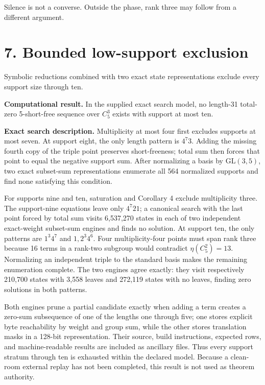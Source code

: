 \documentclass[
  11pt,
]{article}
\begin{document}
Silence is not a converse. Outside the phase, rank three may follow from
a different argument.

\hypertarget{bounded-low-support-exclusion}{%
\section{7. Bounded low-support
exclusion}\label{bounded-low-support-exclusion}}

Symbolic reductions combined with two exact state representations
exclude every support size through ten.

\textbf{Computational result.} In the supplied exact search model, no
length-31 total-zero 5-short-free sequence over \(C_5^3\) exists with
support at most ten.

\textbf{Exact search description.} Multiplicity at most four first
excludes supports at most seven. At support eight, the only length
pattern is \(4^7 3\). Adding the missing fourth copy of the triple point
preserves short-freeness; total sum then forces that point to equal the
negative support sum. After normalizing a basis by \(\mathrm{GL}(3,5)\),
two exact subset-sum representations enumerate all 564 normalized
supports and find none satisfying this condition.

For supports nine and ten, saturation and Corollary 4 exclude
multiplicity three. The support-nine equations leave only \(4^7 2 1\); a
canonical search with the last point forced by total sum visits
6,537,270 states in each of two independent exact-weight subset-sum
engines and finds no solution. At support ten, the only patterns are
\(1^3 4^7\) and \(1,2^3 4^6\). Four multiplicity-four points must span
rank three because 16 terms in a rank-two subgroup would contradict
\(\eta(C_5^2)=13\). Normalizing an independent triple to the standard
basis makes the remaining enumeration complete. The two engines agree
exactly: they visit respectively 210,700 states with 3,558 leaves and
272,119 states with no leaves, finding zero solutions in both patterns.

Both engines prune a partial candidate exactly when adding a term
creates a zero-sum subsequence of one of the lengths one through five;
one stores explicit byte reachability by weight and group sum, while the
other stores translation masks in a 128-bit representation. Their
source, build instructions, expected rows, and machine-readable results
are included as ancillary files. Thus every support stratum through ten
is exhausted within the declared model. Because a clean-room external
replay has not been completed, this result is not used as theorem
authority.
\end{document}
